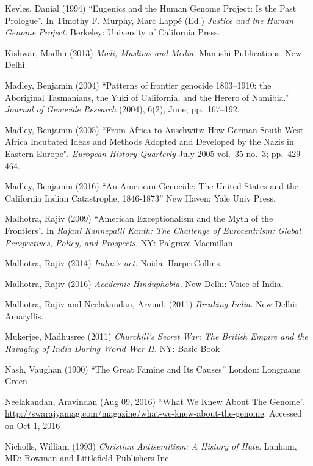 \begin{thebibliography}{99}
Kevles, Danial  (1994) “Eugenics and the Human Genome Project: Is the Past Prologue”. In Timothy F. Murphy, Marc Lappé (Ed.) {\sl Justice and the Human Genome Project.} Berkeley: University of California Press. 

Kishwar, Madhu (2013) {\sl Modi, Muslims and Media.} Manushi Publications. New Delhi.

Madley, Benjamin (2004) “Patterns of frontier genocide 1803--1910: the Aboriginal Tasmanians, the Yuki of California, and the Herero of Namibia.” {\sl Journal of Genocide Research} (2004), 6(2), June; pp.~167--192.

Madley, Benjamin (2005) “From Africa to Auschwitz: How German South West Africa Incubated Ideas and Methods Adopted and Developed by the Nazis in Eastern Europe". {\sl European History Quarterly} July 2005 vol.~35 no.~3; pp.~429--464.

Madley, Benjamin (2016) “An American Genocide: The United States and the California Indian Catastrophe, 1846-1873”  New Haven: Yale Univ Press.

Malhotra, Rajiv (2009) “American Exceptionalism and the Myth of the Frontiers”. In {\sl Rajani Kannepalli Kanth: The Challenge of Eurocentrism: Global Perspectives, Policy, and Prospects.} NY: Palgrave Macmillan.

Malhotra, Rajiv (2014) {\sl Indra’s net.} Noida: HarperCollins.

Malhotra, Rajiv (2016) {\sl Academic Hinduphobia.} New Delhi: Voice of India.

Malhotra, Rajiv and Neelakandan, Arvind. (2011) {\sl Breaking India.} New Delhi: Amaryllis. 

Mukerjee, Madhusree (2011) {\sl Churchill's Secret War: The British Empire and the Ravaging of India During World War II.} NY: Basic Book

Nash, Vaughan (1900) “The Great Famine and Its Causes” London: Longmans Green

Neelakandan, Aravindan (Aug 09, 2016) “What We Knew About The Genome”. \url{http://swarajyamag.com/magazine/what-we-knew-about-the-genome}. 
Accessed on Oct 1, 2016

Nicholls, William (1993) {\sl Christian Antisemitism: A History of Hate}. Lanham, MD: Rowman and Littlefield Publishers Inc


\end{thebibliography}
